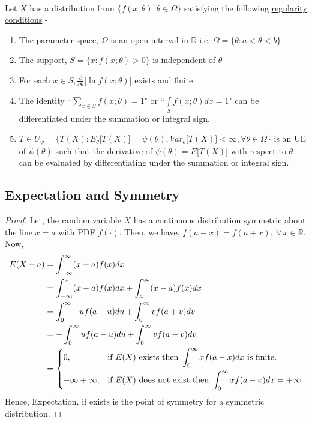\documentclass[12pt, fleqn, a4paper]{article}
\begin{document}
	\paragraph{} Let $X$ has a distribution from $\{f(x;\theta):\theta\in\Omega\}$ satisfying the following \underline{regularity conditions} - 
	\begin{enumerate}[label = (\roman*)] 
		\setlength{\itemsep}{0.7em}
		\item The parameter space, $\Omega$ is an open interval in $\mathbb{R}$ i.e. $\Omega=\{\theta:a<\theta <b\}$
		\item The support, $S=\{x:f(x;\theta)>0\}$ is independent of $\theta$ 
		\item For each $x\in S,\frac{\partial} {\partial\theta}\big[\ln f(x;\theta)\big]$ exists and finite
		\item The identity ``$\sum\limits_{x\in S}f(x;\theta)=1$" or ``$\int\limits_S f(x;\theta)dx=1$" can be differentiated under the summation or integral sign.
		\item $T\in U_\psi=\Big\{T(X):E_\theta\big[T(X)\big]=\psi(\theta), Var_\theta\big[T(X)\big]<\infty,\forall\theta\in\Omega\Big\}$ is an UE of $\psi(\theta)$ such that the derivative of $\psi(\theta)=E\big[T(X)\big]$ with respect to $\theta$ can be evaluated by differentiating under the summation or integral sign.
	\end{enumerate} \vspace{2mm}
	
	\subsection{Expectation and Symmetry} \label{exp_sym}
	\begin{proof}
		Let, the random variable \(X\) has a continuous distribution symmetric about the line \(x=a\) with PDF \(f(\cdot)\). Then, we have, \(f(a-x)=f(a+x),\:\forall\,x\in \mathbb{R}\). Now, 
		\begin{align*}
			E(X-a)&=\int_{-\infty}^\infty(x-a)f(x)dx \\
			&=\int_{-\infty}^a(x-a)f(x)dx+\int_{a}^\infty(x-a)f(x)dx \\
			&=\int_{0}^\infty-uf(a-u)du+\int_{0}^\infty vf(a+v)dv \\
			&=-\int_{0}^\infty uf(a-u)du+\int_{0}^\infty vf(a-v)dv \\
			&=\begin{dcases}
				0, & \text{if }E(X)\text{ exists then }\int_{0}^\infty xf(a-x)dx \text{ is finite.}\\
				-\infty+\infty, & \text{if }E(X)\text{ does not exist then }\int_{0}^\infty xf(a-x)dx=+\infty
			\end{dcases}
		\end{align*}
		Hence, Expectation, if exists is the point of symmetry for a symmetric distribution.
	\end{proof}
		
\end{document}
